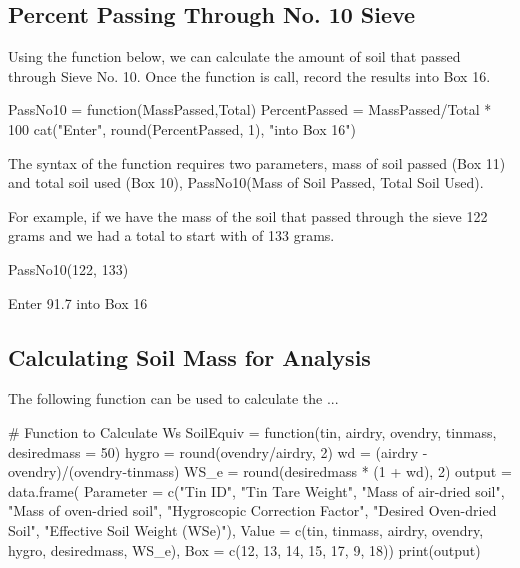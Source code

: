 
\subsection{Percent Passing Through No. 10 Sieve}

Using the function below, we can calculate the amount of soil that passed through Sieve No. 10. Once the function is call, record the results into Box 16. 

\begin{Schunk}
\begin{Sinput}
 PassNo10 = function(MassPassed,Total){
   PercentPassed = MassPassed/Total * 100
   cat("Enter", round(PercentPassed, 1), "into Box 16")
 }
\end{Sinput}
\end{Schunk}

The syntax of the function requires two parameters, mass of soil passed (Box 11) and total soil used (Box 10), PassNo10(Mass of Soil Passed, Total Soil Used). 

For example, if we have the mass of the soil that passed through the sieve 122 grams and we had a total to start with of 133 grams.

\begin{Schunk}
\begin{Sinput}
 PassNo10(122, 133)
\end{Sinput}
\begin{Soutput}
Enter 91.7 into Box 16
\end{Soutput}
\end{Schunk}

\subsection{Calculating Soil Mass for Analysis}

The following function can be used to calculate the ...

\begin{Schunk}
\begin{Sinput}
 # Function to Calculate Ws 
 SoilEquiv = function(tin, airdry, ovendry, tinmass, desiredmass = 50){
 hygro = round(ovendry/airdry, 2)
 wd = (airdry - ovendry)/(ovendry-tinmass)
 WS_e = round(desiredmass * (1 + wd), 2)
 output = data.frame(
   Parameter = c("Tin ID", "Tin Tare Weight", "Mass of air-dried soil", 
       "Mass of oven-dried soil", "Hygroscopic Correction Factor", 
       "Desired Oven-dried Soil", "Effective Soil Weight (WSe)"),
   Value = c(tin, tinmass, airdry, ovendry, hygro, desiredmass, WS_e),
   Box = c(12, 13, 14, 15, 17, 9, 18))
 print(output)
 }
\end{Sinput}
\end{Schunk}

